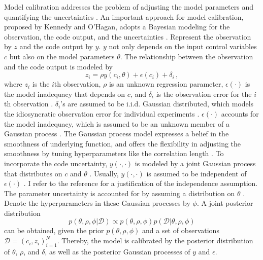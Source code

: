 Model calibration addresses the problem of adjusting the model parameters and 
quantifying the uncertainties \cite{KennedyOhagan2}. 
An important approach for model calibration, proposed by Kennedy and O'Hagan,
adopts a Bayesian modeling for the observation, the code output, and 
the uncertainties \cite{KennedyOhagan2,
model calibrate field data}.
Represent the observation by $z$ and the code output by $y$. 
$y$ not only depends on the input control variables $c$ but also on the model parameters
$\theta$. The relationship between the observation and the code output is modeled 
by
\begin{equation}
    z_i = \rho y(c_i,\theta) + \epsilon (c_i) + \delta_i \,,
    \label{eqn: model calibration}
\end{equation}
where $z_i$ is the $i$th observation, $\rho$ is an unknown regression parameter, 
$\epsilon(\cdot)$ is the model inadequacy that depends on $c$, and $\delta_i$ is the observation
error for the $i$th observation \cite{KennedyOhagan2}. 
$\delta_i$'s are assumed to be i.i.d. Gaussian distributed,
which models the idiosyncratic observation error for individual experiments
\cite{KennedyOhagan2}. $\epsilon(\cdot)$ accounts
for the model inadequacy, which is assumed to be an unknown member of a Gaussian process 
\cite{KennedyOhagan2}. 
The Gaussian process model expresses
a belief in the smoothness of underlying function, and offers the flexibility in adjusting
the smoothness by tuning hyperparameters like the correlation length \cite{KennedyOhagan2}. 
To incorporate the code
uncertainty, $y(\cdot, \cdot)$ is modeled by a joint Gaussian process that distributes 
on $c$ and $\theta$ \cite{KennedyOhagan2}.
Usually, $y(\cdot, \cdot)$ is assumed to be independent of $\epsilon(\cdot)$ \cite{KennedyOhagan2}.
I refer to the reference \cite{markov property} for a justification of the independence assumption.
The parameter uncertainty is accounted for by assuming a distribution on $\theta$ 
\cite{KennedyOhagan2}.
Denote the hyperparameters in these Gaussian processes by $\phi$. A joint posterior distribution
\begin{equation}
    p(\theta, \rho, \phi\big| \mathcal{D}) \propto p(\theta,\rho, \phi) p(\mathcal{D}\big| \theta, \rho,\phi)
\end{equation}
can be obtained, given the prior $p(\theta,\rho,\phi)$ and 
a set of observations $\mathcal{D} = \left(c_i, z_i\right)_{i=1}^N$. Thereby, the model is calibrated
by the posterior distribution of $\theta$, $\rho$, and $\delta$, as well as the posterior Gaussian
processes of $y$ and $\epsilon$.\\

